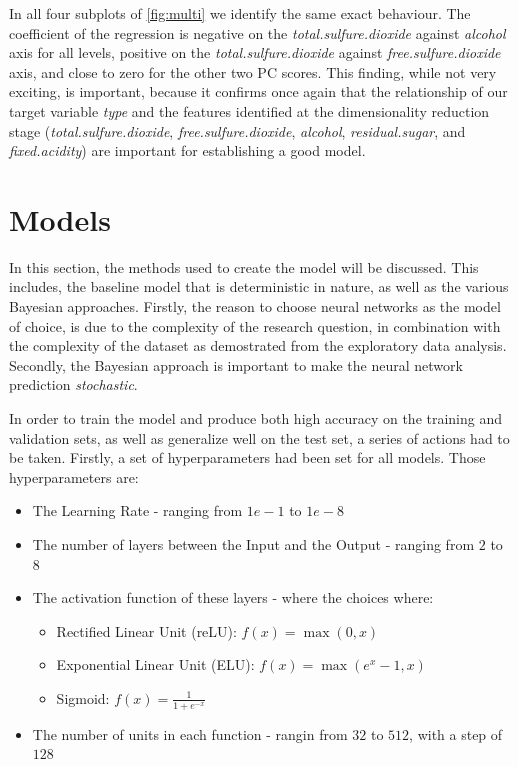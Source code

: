 \documentclass[11pt,twoside]{article}
\numberwithin{Theorem}{section}
\numberwithin{Definition}{section}
\numberwithin{Lemma}{section}
\numberwithin{Algorithm}{section}
\numberwithin{equation}{section}
\begin{document}
In all four subplots of \autoref{fig:multi} we identify the same exact behaviour. The coefficient of the regression is negative on the \textit{total.sulfure.dioxide} against \textit{alcohol} axis for all levels, positive on the \textit{total.sulfure.dioxide} against \textit{free.sulfure.dioxide} axis, and close to zero for the other two PC scores. This finding, while not very exciting, is important, because it confirms once again that the relationship of our target variable \textit{type} and the features identified at the dimensionality reduction stage (\textit{total.sulfure.dioxide}, \textit{free.sulfure.dioxide}, \textit{alcohol}, \textit{residual.sugar}, and \textit{fixed.acidity}) are important for establishing a good model.

\section{Models}
\label{sec:methods}
In this section, the methods used to create the model will be discussed. This includes, the baseline model that is deterministic in nature, as well as the various Bayesian approaches. Firstly, the reason to choose neural networks as the model of choice, is due to the complexity of the research question, in combination with the complexity of the dataset as demostrated from the exploratory data analysis. Secondly, the Bayesian approach is important to make the neural network prediction \textit{stochastic}. 

In order to train the model and produce both high accuracy on the training and validation sets, as well as generalize well on the test set, a series of actions had to be taken. Firstly, a set of hyperparameters had been set for all models. Those hyperparameters are:

\begin{itemize}
\item The Learning Rate - ranging from $1e-1$ to $1e-8$ 
\item The number of layers between the Input and the Output - ranging from $2$ to $8$ 
\item The activation function of these layers - where the choices where:
\begin{itemize}
\item Rectified Linear Unit (reLU): $f(x) = \max(0,x)$
\item Exponential Linear Unit (ELU): $f(x) = \max(e^x-1,x)$
\item Sigmoid: $f(x)=\frac{1}{1+e^{-x}}$
\end{itemize}
\item The number of units in each function - rangin from $32$ to $512$, with a step of $128$
\end{itemize} 
\end{document}
